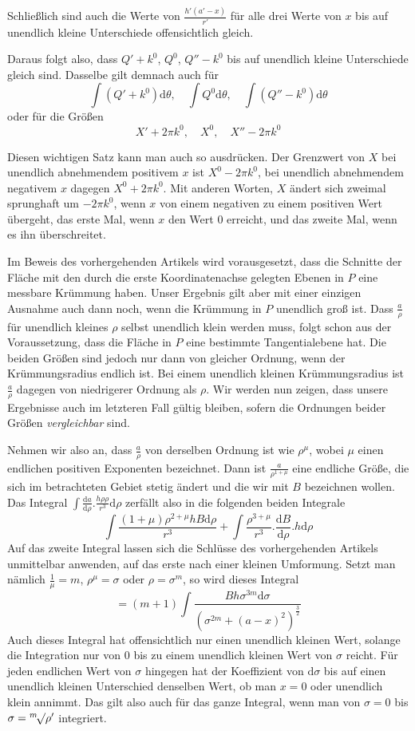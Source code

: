 Schließlich sind auch die Werte von $\frac{h'(a'-x)}{r'}$ für alle drei Werte von $x$ bis auf unendlich kleine Unterschiede offensichtlich gleich.

Daraus folgt also, dass $Q'+k^0$, $Q^0$, $Q''-k^0$ bis auf unendlich kleine Unterschiede gleich sind. Dasselbe gilt demnach auch für
\[
\int(Q'+k^0)\mathrm d\theta,\quad\int Q^0\mathrm d\theta,\quad\int(Q''-k^0)\mathrm d\theta
\]
oder für die Größen
\[
X'+2\pi k^0,\quad X^0,\quad X''-2\pi k^0
\]

%
Diesen wichtigen Satz kann man auch so ausdrücken. Der Grenzwert von $X$ bei unendlich abnehmendem positivem $x$ ist $X^0-2\pi k^0$, bei unendlich abnehmendem negativem $x$ dagegen $X^0+2\pi k^0$. Mit anderen Worten, $X$ ändert sich zweimal sprunghaft um $-2\pi k^0$, wenn $x$ von einem negativen zu einem positiven Wert übergeht, das erste Mal, wenn $x$ den Wert $0$ erreicht, und das zweite Mal, wenn es ihn überschreitet.

Im Beweis des vorhergehenden Artikels wird vorausgesetzt, dass die Schnitte der Fläche mit den durch die erste Koordinatenachse gelegten Ebenen in $P$ eine messbare Krümmung haben. Unser Ergebnis gilt aber mit einer einzigen Ausnahme auch dann noch, wenn die Krümmung in $P$ unendlich groß ist. Dass $\frac a\rho$ für unendlich kleines $\rho$ selbst unendlich klein werden muss, folgt schon aus der Voraussetzung, dass die Fläche in $P$ eine bestimmte Tangentialebene hat. Die beiden Größen sind jedoch nur dann von gleicher Ordnung, wenn der Krümmungsradius endlich ist. Bei einem unendlich kleinen Krümmungsradius ist $\frac a\rho$ dagegen von niedrigerer Ordnung als $\rho$. Wir werden nun zeigen, dass unsere Ergebnisse auch im letzteren Fall gültig bleiben, sofern die Ordnungen beider Größen \textit{vergleichbar} sind.

Nehmen wir also an, dass $\frac a\rho$ von derselben Ordnung ist wie $\rho^\mu$, wobei $\mu$ einen endlichen positiven Exponenten bezeichnet. Dann ist $\frac{a}{\rho^{1+\mu}}$ eine endliche Größe, die sich im betrachteten Gebiet stetig ändert und die wir mit $B$ bezeichnen wollen. Das Integral $\int\frac{\mathrm da}{\mathrm d\rho}.\frac{h\rho\rho}{r^3}\mathrm d\rho$ zerfällt also in die folgenden beiden Integrale
\[
\int\frac{(1+\mu)\rho^{2+\mu}hB\mathrm d\rho}{r^3}+\int\frac{\rho^{3+\mu}}{r^3}.\frac{\mathrm dB}{\mathrm d\rho}.h\mathrm d\rho
\]
Auf das zweite Integral lassen sich die Schlüsse des vorhergehenden Artikels unmittelbar anwenden, auf das erste nach einer kleinen Umformung. Setzt man nämlich $\frac1\mu=m$, $\rho^\mu=\sigma$ oder $\rho=\sigma^m$, so wird dieses Integral
\[
=(m+1)\int\frac{Bh\sigma^{3m}\mathrm d\sigma}{(\sigma^{2m}+(a-x)^2)^{\frac32}}
\]
Auch dieses Integral hat offensichtlich nur einen unendlich kleinen Wert, solange die Integration nur von $0$ bis zu einem unendlich kleinen Wert von $\sigma$ reicht. Für jeden endlichen Wert von $\sigma$ hingegen hat der Koeffizient
%
von $\mathrm d\sigma$ bis auf einen unendlich kleinen Unterschied denselben Wert, ob man $x=0$ oder unendlich klein annimmt. Das gilt also auch für das ganze Integral, wenn man von $\sigma=0$ bis $\sigma=\BareRoot[m]{\rho'}$ integriert.

